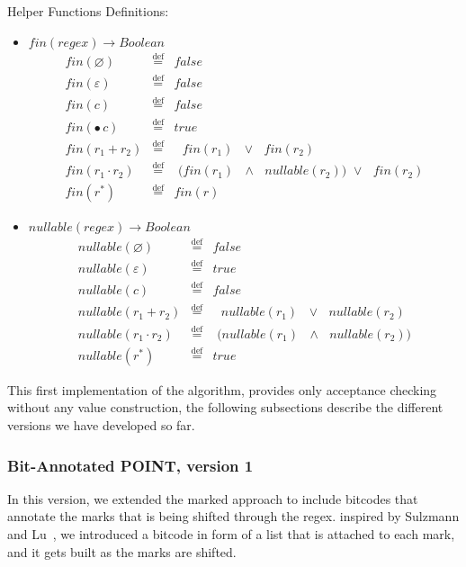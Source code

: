 \documentclass[12pt]{article}
\newcommand{\Marked}[1]{\bullet\,#1}
\begin{document}
Helper Functions Definitions:
\begin{itemize}
\item $fin(regex) \rightarrow Boolean $
  \[
\begin{array}{rcl}
  fin(\varnothing)              & \stackrel{\text{def}}{=} & false \\
  fin(\varepsilon)              & \stackrel{\text{def}}{=} & false \\
  fin(c)              & \stackrel{\text{def}}{=} & false \\
  fin(\Marked{c})      & \stackrel{\text{def}}{=} & true \\
  fin(r_1 + r_2)      & \stackrel{\text{def}}{=} & \text{ $fin(r_1)$ $\lor$ $fin(r_2)$}\\ 
  fin(r_1 \cdot r_2)  & \stackrel{\text{def}}{=} & \text{ ($fin(r_1)$ $\land$ $nullable(r_2)$) $\lor$ $fin(r_2)$}\\
  fin(r^*)            & \stackrel{\text{def}}{=} & fin(r)  
\end{array}
\]

\item $nullable(regex) \rightarrow Boolean $
  \[
\begin{array}{rcl}
  nullable(\varnothing)         & \stackrel{\text{def}}{=} & false \\
  nullable(\varepsilon)              & \stackrel{\text{def}}{=} & true \\
  nullable(c)              & \stackrel{\text{def}}{=} & false \\
  nullable(r_1 + r_2)      & \stackrel{\text{def}}{=} & \text{ $nullable(r_1)$ $\lor$ $nullable(r_2)$}\\ 
  nullable(r_1 \cdot r_2)      & \stackrel{\text{def}}{=} & \text{ ($nullable(r_1)$ $\land$ $nullable(r_2)$)}\\
  nullable(r^*)      & \stackrel{\text{def}}{=} & true 
\end{array}
\]

\end{itemize}
This first implementation of the algorithm, provides only acceptance checking without any value construction, 
the following subsections describe the different versions we have developed so far.

\subsubsection{Bit-Annotated POINT, version 1}
In this version, we extended the marked approach to include bitcodes that annotate the marks that is being 
shifted through the regex. inspired by Sulzmann and Lu~\cite{Sulzmann2014}, we introduced a bitcode in form 
of a list that is attached to each mark, and it gets built as the marks are shifted. 
\end{document}
